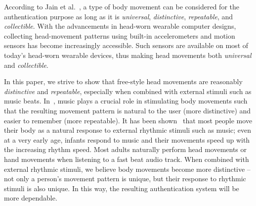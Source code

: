
According to Jain et al.~\cite{jain2004introduction}, a type of body movement can be
considered for the authentication purpose as long as it is \emph{universal}, \emph{distinctive},
\emph{repeatable}, and \emph{collectible}. With the advancements in head-worn
wearable computer designs, collecting head-movement
patterns using built-in accelerometers and motion sensors has become increasingly
accessible. Such sensors are
available on most of today's head-worn wearable devices, thus
making head movements both {\em universal} and \emph{collectible}.

In this paper, we strive to show that free-style head movements are reasonably \emph{distinctive} and \emph{repeatable}, especially when combined with external stimuli such as music beats. In~\systemname, music plays a crucial role in stimulating body movements such that the resulting movement pattern is natural to the user (more distinctive) and easier to remember (more repeatable). It has been shown~\cite{zentner2010rhythmic} that most people move
their body as a natural response to external rhythmic stimuli such as music;
even at a very early age, infants respond to music and their movements speed
up with the increasing rhythm speed. Most adults naturally perform head
movements or hand movements when listening to a fast beat audio track.  When
combined with external rhythmic stimuli, we believe body movements become more
distinctive -- not only a person's movement pattern is unique, but their
response to rhythmic stimuli is also unique. In this way, the resulting
authentication system will be more dependable.

